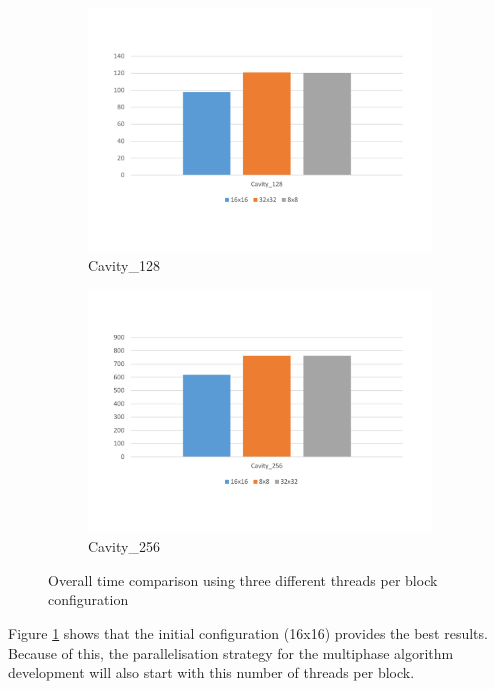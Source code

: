 \documentclass[12pt]{book}
\begin{document}
\begin{figure}[H]
	\centering
	\begin{subfigure}{.49\textwidth}
		\includegraphics[width=\linewidth]{Resources/Images/timesThreads128.pdf}
		\caption{Cavity\_128}
	\end{subfigure}
	\begin{subfigure}{.49\textwidth}
		\includegraphics[width=\linewidth]{Resources/Images/timesThreads256.pdf}
		\caption{Cavity\_256}
	\end{subfigure} 
	\caption{Overall time comparison using three different threads per block configuration}
	\label{fig:timesThreads}
\end{figure} 

Figure \ref{fig:timesThreads} shows that the initial configuration (16x16) provides the best results. Because of this, the parallelisation strategy for the multiphase algorithm development will also start with this number of threads per block.
\end{document}
